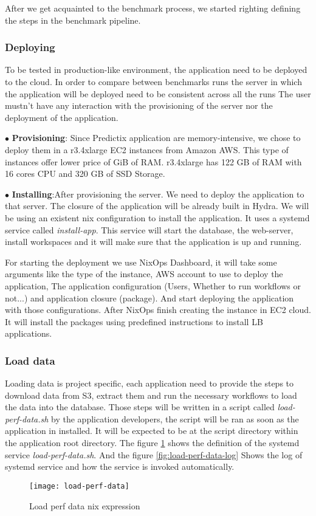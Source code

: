 After we get acquainted to the benchmark process, we started righting defining
the steps in the benchmark pipeline.
\subsubsection{Deploying}
To be tested in production-like environment, the
application need to be deployed to the cloud. In order to compare between
benchmarks runs the server in which the application will be deployed need to be
consistent across all the runs The user mustn't have any interaction with the
provisioning of the server nor the deployment of the application. 

$\bullet$ \textbf{Provisioning}: Since Predictix application are
memory-intensive, we chose to deploy them in a r3.4xlarge EC2 instances
\cite{ec2_instances} from Amazon AWS. This type of instances offer lower price
of GiB of RAM. r3.4xlarge has 122 GB of RAM with 16 cores CPU and 320 GB of SSD
Storage.

$\bullet$ \textbf{Installing}:After provisioning the server. We need to deploy
the application to that server. The closure of the application will be already
built in Hydra. We will be using an existent nix configuration to install the
application. It uses a systemd service called \emph{install-app}. This service
will start the database, the web-server, install workspaces and it will make
sure that the application is up and running.

For starting the deployment we use NixOps Dashboard, it will take
some arguments like the type of the instance, AWS account to use to deploy
the application, The application configuration (Users, Whether to run workflows
or not...) and application closure (package). And start deploying the
application with those configurations. After NixOps finish creating the instance
in EC2 cloud. It will install the packages using predefined instructions to
install LB applications.

\subsubsection{Load data}
Loading data is project specific, each application need to provide the steps to
download data from S3, extract them and run the necessary workflows to load the
data into the database. Those steps will be written in a script called
\emph{load-perf-data.sh} by the application developers, the script will be ran as
soon as the application in installed. It will be expected to be at the script
directory within the application root directory. The figure
\hyperref[fig:load-perf-data]{\ref{fig:load-perf-data}} shows the definition of
the systemd service \emph{load-perf-data.sh}. And the figure
\hyperref[fig:load-perf-data-log]{\ref{fig:load-perf-data-log}} Shows
the log of systemd service and how the service is invoked automatically.
\begin{figure}[h]
  \texttt{[image: load-perf-data]}
\caption{Load perf data nix expression}
\label{fig:load-perf-data}
\end{figure}

